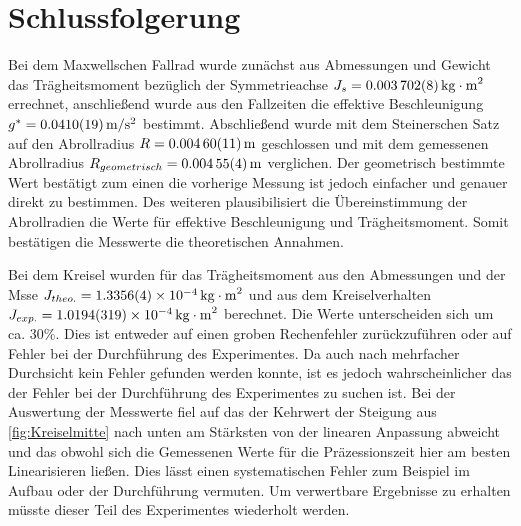 \FloatBarrier
\section{Schlussfolgerung}

Bei dem Maxwellschen Fallrad wurde zunächst aus Abmessungen und Gewicht das Trägheitsmoment bezüglich der Symmetrieachse $J_s=\SI{0.003702 \pm 0.000008}{kg\cdot m^2}$ errechnet, anschließend wurde aus den Fallzeiten die effektive Beschleunigung  $g^*=\SI{0.0410 \pm  0.0019}{m \per s \squared}$ bestimmt. Abschließend wurde mit dem Steinerschen Satz auf den Abrollradius $R=\SI{0.00460\pm 0.00011}{m}$ geschlossen und mit dem gemessenen Abrollradius $R_{geometrisch}=\SI{0.00455 \pm 0.00004}{m}$ verglichen. Der geometrisch bestimmte Wert bestätigt zum einen die vorherige Messung ist jedoch einfacher und genauer direkt zu bestimmen. Des weiteren plausibilisiert die Übereinstimmung der Abrollradien die Werte für effektive Beschleunigung und Trägheitsmoment. Somit bestätigen die Messwerte die theoretischen Annahmen.

Bei dem Kreisel wurden für das Trägheitsmoment aus den Abmessungen und der Msse  $J_{theo.}=\SI{1,3356+-0,0004e-4}{kg \cdot m^2}$ und aus dem Kreiselverhalten $J_{exp.}=\SI{1,0194+-0,0319e-4}{kg \cdot m^2}$ berechnet. Die Werte unterscheiden sich um ca. 30\%.
Dies ist entweder auf einen groben Rechenfehler zurückzuführen oder auf Fehler bei der Durchführung des Experimentes. Da auch nach mehrfacher Durchsicht kein Fehler gefunden werden konnte, ist es jedoch wahrscheinlicher das der Fehler bei der Durchführung des Experimentes zu suchen ist. Bei der Auswertung der Messwerte fiel auf das der Kehrwert der Steigung aus \cref{fig:Kreiselmitte} nach unten am Stärksten von der linearen Anpassung abweicht und das obwohl sich die Gemessenen Werte für die Präzessionszeit hier am besten Linearisieren ließen. Dies lässt einen systematischen Fehler zum Beispiel im Aufbau oder der Durchführung 
vermuten. Um verwertbare Ergebnisse zu erhalten müsste dieser Teil des Experimentes wiederholt werden.








